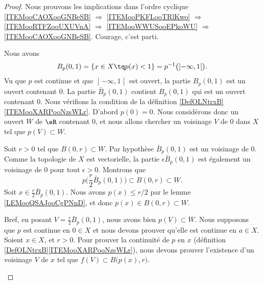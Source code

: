 \begin{proof}
	Nous prouvons les implications dans l'ordre cyclique \ref{ITEMooCAOXooGNBeSB} \( \Rightarrow\) \ref{ITEMooPKFLooTRlKwo} \( \Rightarrow\) \ref{ITEMooRTFZooUXUVnA} \( \Rightarrow\) \ref{ITEMooWWUSooEPkoWU} \( \Rightarrow\) \ref{ITEMooCAOXooGNBeSB}. Courage, c'est parti.
	\begin{subproof}
		\spitem[\ref{ITEMooCAOXooGNBeSB} \( \Rightarrow\) \ref{ITEMooPKFLooTRlKwo}]
		Nous avons
		\begin{equation}
			B_p(0,1)=\{ x\in X\tq p(x)<1 \}=p^{-1}\big( \mathopen] -\infty,1\mathclose[ \big).
		\end{equation}
		Vu que \( p\) est continue et que \( \mathopen] -\infty,1\mathclose[\) est ouvert, la partie \( B_p(0,1)\) est un ouvert contenant \( 0\).
		\spitem[\ref{ITEMooPKFLooTRlKwo} \( \Rightarrow\) \ref{ITEMooRTFZooUXUVnA}]
		La partie \( \bar B_p(0,1)\) contient \( B_p(0,1)\) qui est un ouvert contenant \( 0\).
		\spitem[\ref{ITEMooRTFZooUXUVnA} \( \Rightarrow\) \ref{ITEMooWWUSooEPkoWU}]
		Nous vérifions la condition de la définition \ref{DefOLNtrxB}\ref{ITEMooXARPooNzsWLr}. D'abord \( p(0)=0\). Nous considérons donc un ouvert \( W\) de \( \eR\) contenant \( 0\), et nous allons chercher un voisinage \( V\) de \( 0\) dans \( X\) tel que \( p(V)\subset W\).

		Soit \( r>0\) tel que \( B(0,r)\subset W\). Par hypothèse \( \bar B_p(0,1)\) est un voisinage de \( 0\). Comme la topologie de \( X\) est vectorielle, la partie \( \epsilon\bar B_p(0,1)\) est également un voisinage de \( 0\) pour tout \( \epsilon>0\). Montrons que
		\begin{equation}
			p\Big( \frac{ r }{ 2 }\bar B_p(0,1) \Big)\subset B(0,r)\subset W.
		\end{equation}
		Soit \( x\in \frac{ r }{ 2 }\bar B_p(0,1)\). Nous avons \( p(x)\leq r/2\) par le lemme \ref{LEMooQSAJooCgPNnD}, et donc \( p(x)\in B(0,r)\subset W\).

		Bref, en posant \( V=\frac{ r }{ 2 }\bar B_p(0,1)\), nous avons bien \( p(V)\subset W\).
		\spitem[\ref{ITEMooWWUSooEPkoWU} \( \Rightarrow\) \ref{ITEMooCAOXooGNBeSB}]
		Nous supposons que \( p\) est continue en \( 0\in X\) et nous devons prouver qu'elle est continue en \( a\in X\). Soient \( x\in X\), et \( r>0\). Pour prouver la continuité de \( p\) en \( x\) (définition \ref{DefOLNtrxB}\ref{ITEMooXARPooNzsWLr}), nous devons prouver l'existence d'un voisinage \( V\) de \( x\) tel que \( f(V)\subset B\big( p(x),r \big)\).


\end{subproof}
\end{proof}
